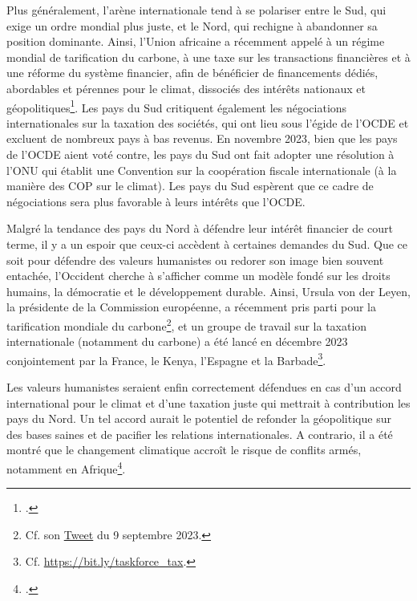 \documentclass[a5paper,french,openany]{memoir}
\begin{document}
Plus généralement, l'arène internationale tend à se polariser entre le Sud, qui exige un ordre mondial plus juste, et le Nord, qui rechigne à abandonner sa position dominante. Ainsi, l'Union africaine a récemment appelé à un régime mondial de tarification du carbone, à une taxe sur les transactions financières et à une réforme du système financier, afin de bénéficier de financements dédiés, abordables et pérennes pour le climat, dissociés des intérêts nationaux et géopolitiques\footnote{\cite{african_union_african_2023}.}. Les pays du Sud critiquent également les négociations internationales sur la taxation des sociétés, qui ont lieu sous l'égide de l'OCDE et excluent de nombreux pays à bas revenus. En novembre 2023, bien que les pays de l'OCDE aient voté contre, les pays du Sud ont fait adopter une résolution à l'ONU qui établit une Convention sur la coopération fiscale internationale (à la manière des COP sur le climat). Les pays du Sud espèrent que ce cadre de négociations sera plus favorable à leurs intérêts que l'OCDE. 

Malgré la tendance des pays du Nord à défendre leur intérêt financier de court terme, il y a un espoir que ceux-ci accèdent à certaines demandes du Sud. 
Que ce soit pour défendre des valeurs humanistes ou redorer son image bien souvent entachée, 
l'Occident cherche à s'afficher comme un modèle fondé sur les droits humains, la démocratie et le développement durable. 
Ainsi, Ursula von der Leyen, la présidente de la Commission européenne, a récemment pris parti pour la tarification mondiale du carbone\footnote{Cf. son \href{https://twitter.com/vonderleyen/status/1700416700238225659}{Tweet} du 9 septembre 2023.}, et un groupe de travail sur la taxation internationale (notamment du carbone) a été lancé en décembre 2023 conjointement par la France, le Kenya, l'Espagne et la Barbade\footnote{Cf. \href{https://www.elysee.fr/admin/upload/default/0001/15/91b013291db03bcc5f2f6b84de39a81ae0c04c7d.pdf}{https://bit.ly/taskforce\_tax}.}. 

Les valeurs humanistes seraient enfin correctement défendues en cas d'un accord international pour le climat et d'une taxation juste qui mettrait à contribution les pays du Nord. Un tel accord aurait le potentiel de refonder la géopolitique sur des bases saines et de pacifier les relations internationales. A contrario, il a été montré que le changement climatique accroît le risque de conflits armés, notamment en Afrique\footnote{\cite{burke_warming_2009,eberle_heat_2020}.}.
\end{document}
